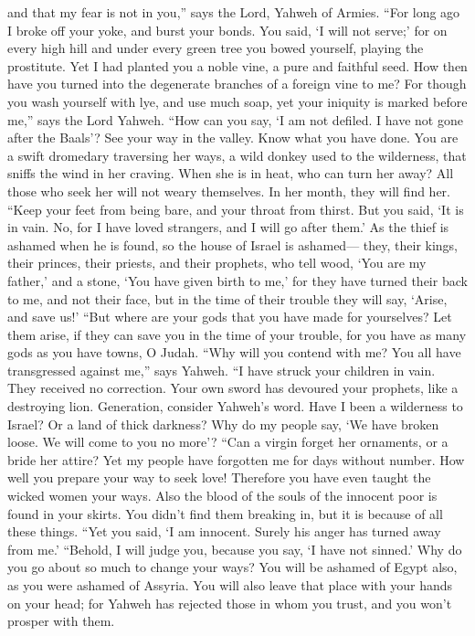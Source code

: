 and that my fear is not in you,'' says the Lord, Yahweh of Armies.
 ``For long ago I broke off your yoke, and burst your
bonds. You said, `I will not serve;' for on every high hill and under
every green tree you bowed yourself, playing the prostitute.
 Yet I had planted you a noble vine, a pure and faithful
seed. How then have you turned into the degenerate branches of a foreign
vine to me?  For though you wash yourself with lye, and
use much soap, yet your iniquity is marked before me,'' says the Lord
Yahweh.  ``How can you say, `I am not defiled. I have not
gone after the Baals'? See your way in the valley. Know what you have
done. You are a swift dromedary traversing her ways,  a
wild donkey used to the wilderness, that sniffs the wind in her craving.
When she is in heat, who can turn her away? All those who seek her will
not weary themselves. In her month, they will find her. 
``Keep your feet from being bare, and your throat from thirst. But you
said, `It is in vain. No, for I have loved strangers, and I will go
after them.'  As the thief is ashamed when he is found,
so the house of Israel is ashamed--- they, their kings, their princes,
their priests, and their prophets,  who tell wood, `You
are my father,' and a stone, `You have given birth to me,' for they have
turned their back to me, and not their face, but in the time of their
trouble they will say, `Arise, and save us!'  ``But where
are your gods that you have made for yourselves? Let them arise, if they
can save you in the time of your trouble, for you have as many gods as
you have towns, O Judah.  ``Why will you contend with me?
You all have transgressed against me,'' says Yahweh.  ``I
have struck your children in vain. They received no correction. Your own
sword has devoured your prophets, like a destroying lion.
 Generation, consider Yahweh's word. Have I been a
wilderness to Israel? Or a land of thick darkness? Why do my people say,
`We have broken loose. We will come to you no more'? 
``Can a virgin forget her ornaments, or a bride her attire? Yet my
people have forgotten me for days without number.  How
well you prepare your way to seek love! Therefore you have even taught
the wicked women your ways.  Also the blood of the souls
of the innocent poor is found in your skirts. You didn't find them
breaking in, but it is because of all these things. 
``Yet you said, `I am innocent. Surely his anger has turned away from
me.' ``Behold, I will judge you, because you say, `I have not sinned.'
 Why do you go about so much to change your ways? You
will be ashamed of Egypt also, as you were ashamed of Assyria.
 You will also leave that place with your hands on your
head; for Yahweh has rejected those in whom you trust, and you won't
prosper with them.

